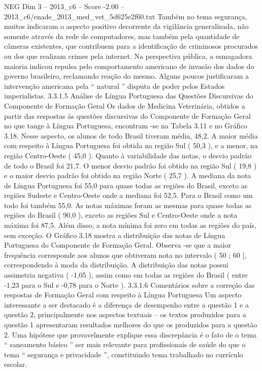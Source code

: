 \begin{textsample}{NEG Dim 3 – 2013\_c6 – Score -2.00 – 2013\_c6/enade\_2013\_med\_vet\_5d625e2f60.txt}
Também no tema segurança, muitos indicaram o aspecto positivo decorrente da vigilância generalizada, não somente através da rede de computadores, mas também pela quantidade de câmeras existentes, que contribuem para a identificação de criminosos procurados ou dos que realizam crimes pela internet.
Na perspectiva pública, a esmagadora maioria indicou repulsa pelo comportamento americano de invasão dos dados do governo brasileiro, reclamando reação do mesmo.
Alguns poucos justificaram a intervenção americana pela “ natural ” disputa de poder pelos Estados imperialistas. 3.3.1.5 Análise de Língua Portuguesa das Questões Discursivas do Componente de Formação Geral Os dados de Medicina Veterinária, obtidos a partir das respostas às questões discursivas do Componente de Formação Geral no que tange à Língua Portuguesa, encontram -se na Tabela 3.11 e no Gráfico 3.18.
Nesse aspecto, os alunos de todo Brasil tiveram média, 48,2.
A maior média com respeito à Língua Portuguesa foi obtida na região Sul ( 50,3 ), e a menor, na região Centro-Oeste ( 45,0 ).
Quanto à variabilidade das notas, o desvio padrão de todo o Brasil foi 21,7.
O menor desvio padrão foi obtido na região Sul ( 19,8 ) e o maior desvio padrão foi obtido na região Norte ( 25,7 ).
A mediana da nota de Língua Portuguesa foi 55,0 para quase todas as regiões do Brasil, exceto as regiões Sudeste e Centro-Oeste onde a mediana foi 52,5.
Para o Brasil como um todo foi também 55,0.
As notas máximas foram as mesmas para quase todas as regiões do Brasil ( 90,0 ), exceto as regiões Sul e Centro-Oeste onde a nota máxima foi 87,5.
Além disso, a nota mínima foi zero em todas as regiões do país, sem exceção.
O Gráfico 3.18 mostra a distribuição das notas de Língua Portuguesa do Componente de Formação Geral.
Observa -se que a maior frequência corresponde aos alunos que obtiveram nota no intervalo ( 50 ; 60 ], correspondendo à moda da distribuição.
A distribuição das notas possui assimetria negativa ( -1,05 ), assim como em todas as regiões do Brasil ( entre -1,23 para o Sul e -0,78 para o Norte ). 3.3.1.6 Comentários sobre a correção das respostas de Formação Geral com respeito à Língua Portuguesa Um aspecto interessante a ser destacado é a diferença de desempenho entre a questão 1 e a questão 2, principalmente nos aspectos textuais – os textos produzidos para a questão 1 apresentaram resultados melhores do que os produzidos para a questão 2.
Uma hipótese que provavelmente explique essa discrepância é o fato de o tema “ saneamento básico ” ser mais relevante para profissionais de saúde do que o tema “ segurança e privacidade ”, constituindo tema trabalhado no currículo escolar.

\end{textsample}
